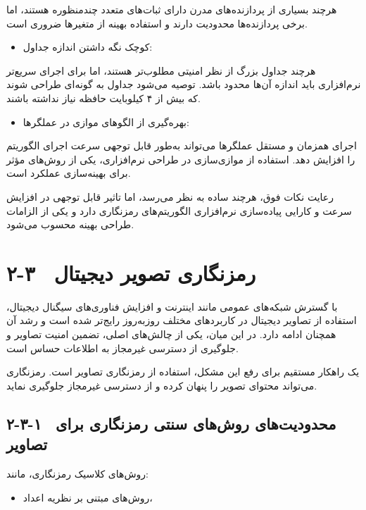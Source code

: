 هرچند بسیاری از پردازنده‌های مدرن دارای ثبات‌های متعدد چندمنظوره هستند، اما برخی پردازنده‌ها محدودیت دارند و استفاده بهینه از متغیرها ضروری است.

\begin{itemize}
    \item کوچک نگه داشتن اندازه جداول:
\end{itemize}

هرچند جداول بزرگ از نظر امنیتی مطلوب‌تر هستند، اما برای اجرای سریع‌تر نرم‌افزاری باید اندازه آن‌ها محدود باشد. توصیه می‌شود جداول به گونه‌ای طراحی شوند که بیش از ۴ کیلوبایت حافظه نیاز نداشته باشند.

\begin{itemize}
    \item بهره‌گیری از الگوهای موازی در عملگرها:
\end{itemize}

اجرای همزمان و مستقل عملگرها می‌تواند به‌طور قابل توجهی سرعت اجرای الگوریتم را افزایش دهد. استفاده از موازی‌سازی در طراحی نرم‌افزاری، یکی از روش‌های مؤثر برای بهینه‌سازی عملکرد است.

رعایت نکات فوق، هرچند ساده به نظر می‌رسد، اما تاثیر قابل توجهی در افزایش سرعت و کارایی پیاده‌سازی نرم‌افزاری الگوریتم‌های رمزنگاری دارد و یکی از الزامات طراحی بهینه محسوب می‌شود.

\section{۲-۳  رمزنگاری تصویر دیجیتال}

با گسترش شبکه‌های عمومی مانند اینترنت و افزایش فناوری‌های سیگنال دیجیتال، استفاده از تصاویر دیجیتال در کاربردهای مختلف روزبه‌روز رایج‌تر شده است و رشد آن همچنان ادامه دارد\cite{ref39}. در این میان، یکی از چالش‌های اصلی، تضمین امنیت تصاویر و جلوگیری از دسترسی غیرمجاز به اطلاعات حساس است.

یک راهکار مستقیم برای رفع این مشکل، استفاده از رمزنگاری تصاویر است. رمزنگاری می‌تواند محتوای تصویر را پنهان کرده و از دسترسی غیرمجاز جلوگیری نماید.

\subsection{۲-۳-۱  محدودیت‌های روش‌های سنتی رمزنگاری برای تصاویر}

روش‌های کلاسیک رمزنگاری، مانند:

\begin{itemize}
    \item روش‌های مبتنی بر نظریه اعداد،
\end{itemize}


